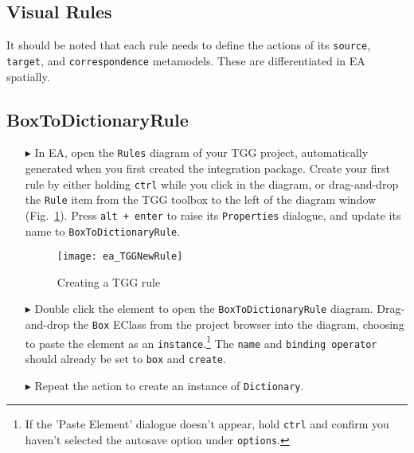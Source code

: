 \newpage
\hypertarget{rules vis}{}
\subsection{Visual Rules}
\visHeader

It should be noted that each rule needs to define the actions of its \texttt{source}, \texttt{target}, and \texttt{correspondence} metamodels. These are
differentiated in EA spatially.

\subsection{BoxToDictionaryRule}

\begin{enumerate}

\item[$\blacktriangleright$] In EA, open the \texttt{Rules} diagram of your TGG project, automatically generated when you first created the integration package.
Create your first rule by either holding \texttt{ctrl} while you click in the diagram, or drag-and-drop the \texttt{Rule} item from the TGG toolbox to the left
of the diagram window (Fig.~\ref{fig:create_tgg_rule}). Press \texttt{alt + enter} to raise its \texttt{Properties} dialogue, and update its name to
\texttt{BoxToDictionaryRule}.

\vspace{0.5cm}

\begin{figure}[htbp]
\begin{center}
  \texttt{[image: ea\_TGGNewRule]}
  \caption{Creating a TGG rule}
  \label{fig:create_tgg_rule}
\end{center}
\end{figure}

\item[$\blacktriangleright$] Double click the element to open the \texttt{BoxToDictionaryRule} diagram. Drag-and-drop the \texttt{Box} EClass from the project
browser into the diagram, choosing to paste the element as an \texttt{instance}.\footnote{If the 'Paste Element' dialogue doesn't appear, hold \texttt{ctrl} and
confirm you haven't selected the autosave option under \texttt{options}.} The \texttt{name} and \texttt{binding operator} should already be set to \texttt{box}
and \texttt{create}.

\item[$\blacktriangleright$] Repeat the action to create an instance of \texttt{Dictionary}.


\end{enumerate}
